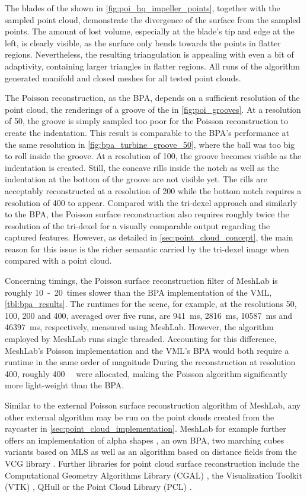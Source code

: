 The blades of the \impeller shown in \cref{fig:poi_hq_impeller_points}, together with the sampled point cloud, demonstrate the divergence of the surface from the sampled points.
The amount of lost volume, especially at the blade's tip and edge at the left, is clearly visible, as the surface only bends towards the points in flatter regions.
Nevertheless, the resulting triangulation is appealing with even a bit of adaptivity, containing larger triangles in flatter regions.
All runs of the algorithm generated manifold and closed meshes for all tested point clouds.

The Poisson reconstruction, as the BPA, depends on a sufficient resolution of the point cloud, \cf the renderings of a groove of the \turbine in \cref{fig:poi_grooves}.
At a resolution of 50, the groove is simply sampled too poor for the Poisson reconstruction to create the indentation.
This result is comparable to the BPA's performance at the same resolution in \cref{fig:bpa_turbine_groove_50}, where the ball was too big to roll inside the groove.
At a resolution of 100, the groove becomes visible as the indentation is created.
Still, the concave rills inside the notch as well as the indentation at the bottom of the groove are not visible yet.
The rills are acceptably reconstructed at a resolution of 200 while the bottom notch requires a resolution of 400 to appear.
Compared with the tri-dexel approach and similarly to the BPA, the Poisson surface reconstruction also requires roughly twice the resolution of the tri-dexel for a visually comparable output regarding the captured features.
However, as detailed in \cref{sec:point_cloud_concept}, the main reason for this issue is the richer semantic carried by the tri-dexel image when compared with a point cloud.

Concerning timings, the Poisson surface reconstruction filter of MeshLab is roughly 10~-~20~times slower than the BPA implementation of the VML, \cf \cref{tbl:bpa_results}.
The runtimes for the \turbine scene, for example, at the resolutions 50, 100, 200 and 400, averaged over five runs, are \SI{941}{\milli\second}, \SI{2816}{\milli\second}, \SI{10587}{\milli\second} and \SI{46397}{\milli\second}, respectively, measured using MeshLab.
However, the algorithm employed by MeshLab runs single threaded.
Accounting for this difference, MeshLab's Poisson implementation and the VML's BPA would both require a runtime in the same order of magnitude
During the reconstruction at resolution 400, roughly \SI{400}{\mebi\byte} were allocated, making the Poisson algorithm significantly more light-weight than the BPA.

Similar to the external Poisson surface reconstruction algorithm of MeshLab, any other external algorithm may be run on the point clouds created from the raycaster in \cref{sec:point_cloud_implementation}.
MeshLab for example further offers an implementation of alpha shapes \cite{alpha_shape}, an own BPA, two marching cubes variants based on MLS \cite{meshlab_mc_mls_1, meshlab_mc_mls_2} as well as an algorithm based on distance fields from the VCG library \cite{vcg}.
Further libraries for point cloud surface reconstruction include the Computational Geometry Algorithms Library (CGAL) \cite{cgal}, the Visualization Toolkit (VTK) \cite{vtk}, QHull \cite{qhull} or the Point Cloud Library (PCL) \cite{pcl}.
